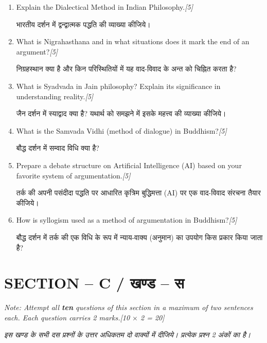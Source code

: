 \documentclass[11pt,a4paper]{article}
\newcommand{\pts}[1]{\hfill \textit{[#1]}}
\begin{document}
\begin{enumerate}[label=\textbf{\arabic*.},leftmargin=*,start=6,itemsep=10pt]

  \item Explain the Dialectical Method in Indian Philosophy.\pts{5}
  
  भारतीय दर्शन में द्वन्द्वात्मक पद्धति की व्याख्या कीजिये।

  \item What is Nigrahasthana and in what situations does it mark the end of an argument?\pts{5}
  
  निग्रहस्थान क्या है और किन परिस्थितियों में यह वाद-विवाद के अन्त को चिह्नित करता है?

  \item What is Syadvada in Jain philosophy? Explain its significance in understanding reality.\pts{5}
  
  जैन दर्शन में स्याद्वाद क्या है? यथार्थ को समझने में इसके महत्त्व की व्याख्या कीजिये।

  \item What is the Samvada Vidhi (method of dialogue) in Buddhism?\pts{5}
  
  बौद्ध दर्शन में सम्वाद विधि क्या है?

  \item Prepare a debate structure on Artificial Intelligence (AI) based on your favorite system of argumentation.\pts{5}
  
  तर्क की अपनी पसंदीदा पद्धति पर आधारित कृत्रिम बुद्धिमत्ता (AI) पर एक वाद-विवाद संरचना तैयार कीजिये।

  \item How is syllogism used as a method of argumentation in Buddhism?\pts{5}
  
  बौद्ध दर्शन में तर्क की एक विधि के रूप में न्याय-वाक्य (अनुमान) का उपयोग किस प्रकार किया जाता है?

\end{enumerate}

\bigskip

\section*{SECTION -- C / खण्ड -- स}
\noindent \textit{Note: Attempt all \textbf{ten} questions of this section in a maximum of two sentences each. Each question carries 2 marks.}\pts{10 $\times$ 2 = 20}

\noindent \textit{इस खण्ड के सभी दस प्रश्नों के उत्तर अधिकतम दो वाक्यों में दीजिये। प्रत्येक प्रश्न 2 अंकों का है।}
\end{document}
